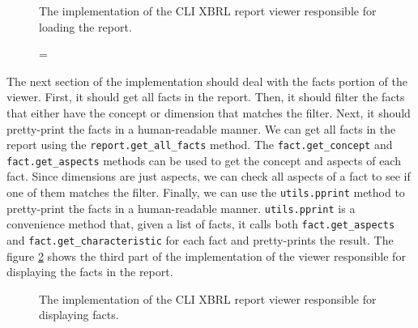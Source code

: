 \begin{figure}[H]
    \centering
    \label{fig:viewer_2}
    \caption={The implementation of the CLI XBRL report viewer responsible for loading the report.}
    
\end{figure}

The next section of the implementation should deal with the facts portion of the viewer.
First, it should get all facts in the report.
Then, it should filter the facts that either have the concept or dimension that matches the filter.
Next, it should pretty-print the facts in a human-readable manner.
We can get all facts in the report using the \texttt{report.get\_all\_facts} method.
The \texttt{fact.get\_concept} and \texttt{fact.get\_aspects} methods can be used to get the concept and aspects of each fact.
Since dimensions are just aspects, we can check all aspects of a fact to see if one of them matches the filter.
Finally, we can use the \texttt{utils.pprint} method to pretty-print the facts in a human-readable manner.
\texttt{utils.pprint} is a convenience method that, given a list of facts, it calls both \texttt{fact.get\_aspects} and \texttt{fact.get\_characteristic} for each fact and pretty-prints the result.
The figure \ref{fig:viewer_3} shows the third part of the implementation of the viewer responsible for displaying the facts in the report.

\begin{figure}[H]
    \centering
    \caption{The implementation of the CLI XBRL report viewer responsible for displaying facts.}
    \label{fig:viewer_3}
    
\end{figure}

